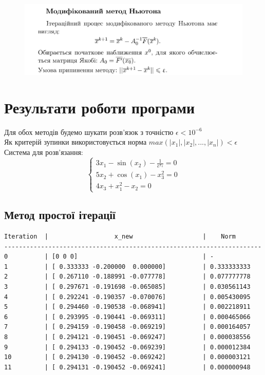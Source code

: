 \documentclass[a4paper, 12pt]{article}
\begin{document}
\begin{figure}[ht]
	\centering
	\includegraphics[width=0.9\linewidth]{mod_nuton1.png}
\end{figure}

\newpage

\section{Результати роботи програми}

Для обох методів будемо шукати розв'язок з точністю $\epsilon < 10^{-6}$ \\
Як критерій зупинки використовується норма $max(|x_1|, |x_2|, ..., |x_n|) < \epsilon$ \\ 
Система для розв'язання: 
\[
\begin{cases}
3x_1 - \sin(x_2) - \frac{1}{e^{x_3}} = 0 \\
5x_2 + \cos(x_1) - x_3^2 = 0 \\
4x_3 + x_1^2 - x_2 = 0
\end{cases}
\]

\subsection{Метод простої ітерації}

\begin{verbatim}
Iteration  |                  x_new                   |    Norm   
----------------------------------------------------------------------
0          | [0 0 0]                                  | -
1          | [ 0.333333 -0.200000  0.000000]          | 0.333333333
2          | [ 0.267110 -0.188991 -0.077778]          | 0.077777778
3          | [ 0.297671 -0.191698 -0.065085]          | 0.030561143
4          | [ 0.292241 -0.190357 -0.070076]          | 0.005430095
5          | [ 0.294460 -0.190538 -0.068941]          | 0.002218911
6          | [ 0.293995 -0.190441 -0.069311]          | 0.000465066
7          | [ 0.294159 -0.190458 -0.069219]          | 0.000164057
8          | [ 0.294121 -0.190451 -0.069247]          | 0.000038556
9          | [ 0.294133 -0.190452 -0.069239]          | 0.000012384
10         | [ 0.294130 -0.190452 -0.069242]          | 0.000003121
11         | [ 0.294131 -0.190452 -0.069241]          | 0.000000948
\end{verbatim}
\end{document}
